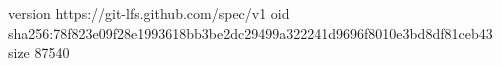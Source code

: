 version https://git-lfs.github.com/spec/v1
oid sha256:78f823e09f28e1993618bb3be2dc29499a322241d9696f8010e3bd8df81ceb43
size 87540
